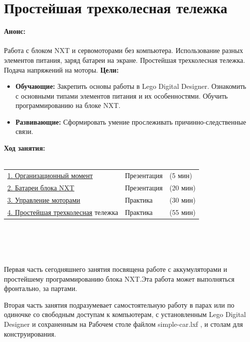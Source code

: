\chapter{Простейшая трехколесная тележка}
{\bfseries Анонс:}\\\\
Работа с блоком NXT и сервомоторами без компьютера. Использование разных элементов питания, заряд батареи на экране. Простейшая трехколесная тележка. Подача напряжений на моторы.
{\bfseries Цели:}
\begin{itemize}
	\item{}{\bfseries Обучающие:} Закрепить  основы работы в Lego Digital Designer. Ознакомить с основными типами элементов питания и их особенностями. Обучить программированию на блоке NXT.  
	\item{}{\bfseries Развивающие:} Сформировать умение прослеживать причинно-следственные связи.\\
\end{itemize}	
{\bfseries Ход занятия:}\\\\
\begin{tabular}{lll}
	\hyperlink{lesson4x1}{1. Организационный момент} & Презентация & (5 мин)\\
	\hyperlink{lesson4x2}{2. Батареи блока NXT} & Презентация & (20 мин) \\
	\hyperlink{lesson4x3}{3. Управление моторами} & Практика & (30 мин) \\
	\hyperlink{lesson4x4}{4. Простейшая трехколесная} тележка & Практика & (55 мин)\\
\end{tabular}\\\\

{\hypertarget{lesson4x1}{}}\\\\

Первая часть сегодняшнего занятия посвящена работе с аккумуляторами и простейшему программированию блока NXT.Эта работа может выполняться фронтально, за партами.

Вторая часть занятия подразумевает самостоятельную работу в парах или по одиночке со свободным доступам к компьютерам, с установленным Lego Digital Designer и сохраненным на Рабочем столе файлом simple-car.lxf , и столам для конструирования.\\\\

{\hypertarget{lesson4x2}{}}\\\\

